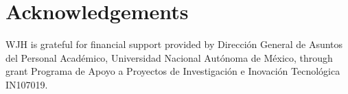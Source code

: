 \documentclass[twocolumn]{aastex63}
\begin{document}
\section*{Acknowledgements}
WJH is grateful for financial support provided by
\foreignlanguage{spanish}{
  Dirección General de Asuntos del Personal Académico,
  Universidad Nacional Autónoma de México},
through grant
\foreignlanguage{spanish}{
  Programa de Apoyo a Proyectos de Investigación
  e Inovación Tecnológica}
IN107019.



\end{document}
